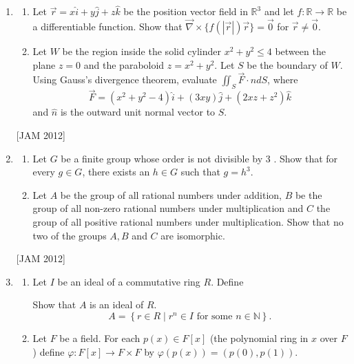 \begin{enumerate}
\begin{enumerate}
\end{enumerate}
\hfill [JAM 2012]





\item

\begin{enumerate}
    
  \item Let $\vec{r}=x \hat{i}+y \hat{j}+z \hat{k}$ be the position vector field in $\mathbb{R}^{3}$ and let $f: \mathbb{R} \rightarrow \mathbb{R}$ be a differentiable function. Show that $\vec{\nabla} \times\{f(|\vec{r}|) \vec{r}\}=\overrightarrow{0}$ for $\vec{r} \neq \overrightarrow{0}$.

\item Let $W$ be the region inside the solid cylinder $x^{2}+y^{2} \leq 4$ between the plane $z=0$ and the paraboloid $z=x^{2}+y^{2}$. Let $S$ be the boundary of $W$. Using Gauss's divergence theorem, evaluate $\iint_{S} \vec{F} \cdot \hat{n} d S$, where
$$
\vec{F}=\left(x^{2}+y^{2}-4\right) \hat{i}+(3 x y) \hat{j}+\left(2 x z+z^{2}\right) \hat{k}
$$
and $\hat{n}$ is the outward unit normal vector to $S$.
\end{enumerate}
\hfill [JAM 2012]



\item 

\begin{enumerate}
     \item Let $G$ be a finite group whose order is not divisible by 3 . Show that for every $g \in G$, there exists an $h \in G$ such that $g=h^{3}$.

\item Let $A$ be the group of all rational numbers under addition, $B$ be the group of all non-zero rational numbers under multiplication and $C$ the group of all positive rational numbers under multiplication. Show that no two of the groups $A, B$ and $C$ are isomorphic.
\end{enumerate}
\hfill [JAM 2012]




\item 


\begin{enumerate}
    \item Let $I$ be an ideal of a commutative ring $R$. Define

Show that $A$ is an ideal of $R$.
$$
A=\left\{r \in R \mid r^{n} \in I \text { for some } n \in \mathbb{N}\right\} .
$$
\item Let $F$ be a field. For each $p(x) \in F[x]$ (the polynomial ring in $x$ over $F$ ) define $\varphi: F[x] \rightarrow F \times F$ by $\varphi(p(x))=(p(0), p(1))$.



\end{enumerate}
\end{enumerate}
